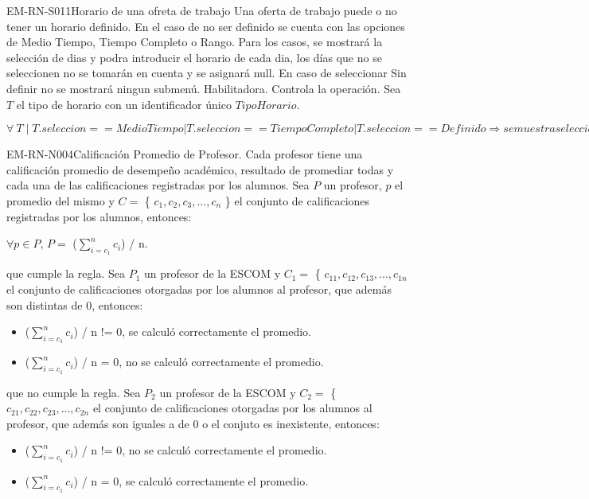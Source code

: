 \begin{BussinesRule}{EM-RN-S011}{Horario de una ofreta de trabajo}
	\BRitem[Descripción:] 
	Una oferta de trabajo puede o no tener un horario definido. En el caso de no ser definido se cuenta con las opciones de Medio Tiempo, Tiempo Completo o Rango. Para los casos, se mostrará la selección de dias y podra introducir el horario de cada dia, los días que no se seleccionen no se tomarán en cuenta y se asignará null. En caso de seleccionar Sin definir no se mostrará ningun submenú.
	\BRitem[Tipo:] Habilitadora.
	\BRitem[Nivel:] Controla la operación.
	\BRitem[Sentencia: ] Sea $T$  el tipo de horario con un identificador único $TipoHorario$.
	\begin{center}
		$\forall \: T  \mid T.seleccion == Medio Tiempo | T.seleccion == Tiempo Completo | T.seleccion == Definido  \Rightarrow se muestra seleccion de dias.$
	\end{center}
\end{BussinesRule}

\begin{BussinesRule}{EM-RN-N004}{Calificación Promedio de Profesor.} 
	\BRitem[Descripción:] Cada profesor tiene una calificación promedio de desempeño académico, resultado de promediar todas y cada una de las calificaciones registradas por los alumnos.
	\BRitem[Sentenia: ] Sea $P$ un profesor, $p$ el promedio del mismo y $C =$ \{ $c_{1},c_{2},c_{3},...,c_{n}$  \} el conjunto de calificaciones registradas por los alumnos, entonces:
	\begin{center}
		$\forall p \in P$, $P=$ ($ \sum_{i=c_1}^{n}c_{i} $) / n.
	\end{center}
	 que cumple la regla.
		Sea $P_{1}$ un profesor de la ESCOM y $C_{1} =$ \{ $c_{11},c_{12},c_{13},...,c_{1n}$ el conjunto de calificaciones otorgadas por los alumnos al profesor, que además son distintas de 0, entonces:
		\begin{itemize}
			\item ($ \sum_{i=c_1}^{n}c_{i} $) / n != 0, se calculó correctamente el promedio.
			\item ($ \sum_{i=c_1}^{n}c_{i} $) / n = 0, no se calculó correctamente el promedio.
		\end{itemize}
	 que no cumple la regla.
		Sea $P_{2}$ un profesor de la ESCOM y $C_{2} =$ \{ $c_{21},c_{22},c_{23},...,c_{2n}$ el conjunto de calificaciones otorgadas por los alumnos al profesor, que además son iguales a de 0 o el conjuto es inexistente, entonces:
		\begin{itemize}
			\item ($ \sum_{i=c_1}^{n}c_{i} $) / n != 0, no se calculó correctamente el promedio.
			\item ($ \sum_{i=c_1}^{n}c_{i} $) / n = 0, se calculó correctamente el promedio.
		\end{itemize}
\end{BussinesRule}

